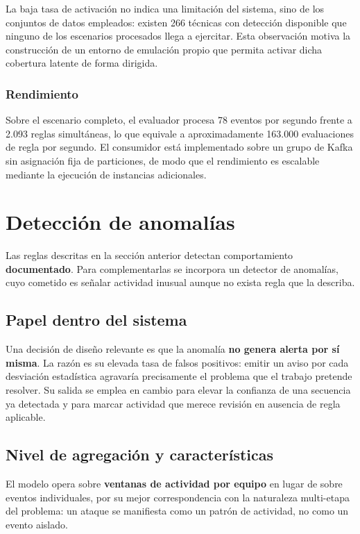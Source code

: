 La baja tasa de activación no indica una limitación del sistema, sino de los conjuntos de
datos empleados: existen 266 técnicas con detección disponible que ninguno de los escenarios
procesados llega a ejercitar. Esta observación motiva la construcción de un entorno de
emulación propio que permita activar dicha cobertura latente de forma dirigida.

\subsubsection{Rendimiento}

Sobre el escenario completo, el evaluador procesa 78 eventos por segundo frente a 2.093 reglas
simultáneas, lo que equivale a aproximadamente 163.000 evaluaciones de regla por segundo. El
consumidor está implementado sobre un grupo de Kafka sin asignación fija de particiones, de
modo que el rendimiento es escalable mediante la ejecución de instancias adicionales.

\section{Detección de anomalías}
\label{sec:anomalias}

Las reglas descritas en la sección anterior detectan comportamiento \textbf{documentado}. Para
complementarlas se incorpora un detector de anomalías, cuyo cometido es señalar actividad
inusual aunque no exista regla que la describa.

\subsection{Papel dentro del sistema}

Una decisión de diseño relevante es que la anomalía \textbf{no genera alerta por sí misma}.
La razón es su elevada tasa de falsos positivos: emitir un aviso por cada desviación
estadística agravaría precisamente el problema que el trabajo pretende resolver. Su salida se
emplea en cambio para elevar la confianza de una secuencia ya detectada y para marcar
actividad que merece revisión en ausencia de regla aplicable.

\subsection{Nivel de agregación y características}

El modelo opera sobre \textbf{ventanas de actividad por equipo} en lugar de sobre eventos
individuales, por su mejor correspondencia con la naturaleza multi-etapa del problema: un
ataque se manifiesta como un patrón de actividad, no como un evento aislado.

